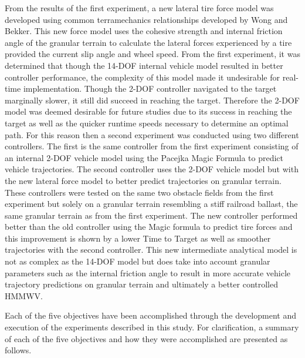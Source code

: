 \documentclass[12pt,onecolumn]{report}
\begin{document}
From the results of the first experiment, a new lateral tire force model was developed using common terramechanics relationships developed by Wong and Bekker. This new force model uses the cohesive strength and internal friction angle of the granular terrain to calculate the lateral forces experienced by a tire provided the current slip angle and wheel speed. From the first experiment, it was determined that though the 14-DOF internal vehicle model resulted in better controller performance, the complexity of this model made it undesirable for real-time implementation. Though the 2-DOF controller navigated to the target marginally slower, it still did succeed in reaching the target. Therefore the 2-DOF model was deemed desirable for future studies due to its success in reaching the target as well as the quicker runtime speeds necessary to determine an optimal path. For this reason then a second experiment was conducted using two different controllers. The first is the same controller from the first experiment consisting of an internal 2-DOF vehicle model using the Pacejka Magic Formula to predict vehicle trajectories. The second controller uses the 2-DOF vehicle model but with the new lateral force model to better predict trajectories on granular terrain. These controllers were tested on the same two obstacle fields from the first experiment but solely on a granular terrain resembling a stiff railroad ballast, the same granular terrain as from the first experiment. The new controller performed better than the old controller using the Magic formula to predict tire forces and this improvement is shown by a lower Time to Target as well as smoother trajectories with the second controller. This new intermediate analytical model is not as complex as the 14-DOF model but does take into account granular parameters such as the internal friction angle to result in more accurate vehicle trajectory predictions on granular terrain and ultimately a better controlled HMMWV. 

Each of the five objectives have been accomplished through the development and execution of the experiments described in this study. For clarification, a summary of each of the five objectives and how they were accomplished are presented as follows.
\end{document}
